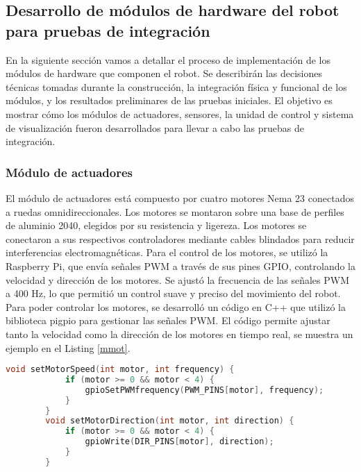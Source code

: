 \subsection{Desarrollo de m\'odulos de hardware del robot para pruebas de integraci\'on}
\label{sec:Desarrollo de m\'odulos de hardware del robot para pruebas de integraci\'on}
    En la siguiente secci\'on vamos a detallar el proceso de implementaci\'on de los m\'odulos
        de hardware que componen el robot. Se describir\'an las decisiones t\'ecnicas tomadas
        durante la construcci\'on, la integraci\'on f\'isica y funcional de los m\'odulos, y los
        resultados preliminares de las pruebas iniciales. El objetivo es mostrar c\'omo los
        m\'odulos de actuadores, sensores, la unidad de control y sistema de visualizaci\'on
        fueron desarrollados para llevar a cabo las pruebas de integraci\'on.
    \vskip 0.5cm
    \subsubsection{M\'odulo de actuadores}
    El m\'odulo de actuadores est\'a compuesto por cuatro motores Nema 23 conectados a
        ruedas omnidireccionales. Los motores se montaron sobre una base de perfiles de
        aluminio 2040, elegidos por su resistencia y ligereza. Los motores se conectaron a sus
        respectivos controladores mediante cables blindados para reducir interferencias
        electromagn\'eticas.
    \vskip 0.5cm
    Para el control de los motores, se utiliz\'o la Raspberry Pi, que env\'ia se\~nales PWM a
        trav\'es de sus pines GPIO, controlando la velocidad y direcci\'on de los motores. Se
        ajust\'o la frecuencia de las se\~nales PWM a 400 Hz, lo que permiti\'o un control suave y
        preciso del movimiento del robot.
    \vskip 0.5cm
    Para poder controlar los motores, se desarroll\'o un c\'odigo en C++ que utiliz\'o la
        biblioteca pigpio para gestionar las se\~nales PWM. El c\'odigo permite ajustar tanto la
        velocidad como la direcci\'on de los motores en tiempo real, se muestra un ejemplo en el
        Listing \ref{mmot}.
    \vskip 0.5cm
    \begin{lstlisting}[language={C++}, caption={C\'odigo de ejemplo de motores}, label={mmot}]
        void setMotorSpeed(int motor, int frequency) {
            if (motor >= 0 && motor < 4) {
                gpioSetPWMfrequency(PWM_PINS[motor], frequency);
            }
        }
        void setMotorDirection(int motor, int direction) {
            if (motor >= 0 && motor < 4) {
                gpioWrite(DIR_PINS[motor], direction);
            }
        }
    \end{lstlisting}
    \vskip 0.5cm
